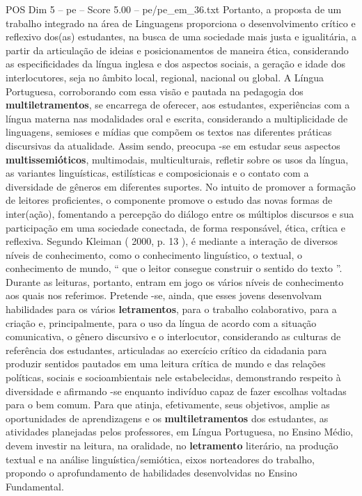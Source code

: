 \begin{textsample}{POS Dim 5 – pe – Score 5.00 – pe/pe\_em\_36.txt}
Portanto, a proposta de um trabalho integrado na área de Linguagens proporciona o desenvolvimento crítico e reflexivo dos(as) estudantes, na busca de uma sociedade mais justa e igualitária, a partir da articulação de ideias e posicionamentos de maneira ética, considerando as especificidades da língua inglesa e dos aspectos sociais, a geração e idade dos interlocutores, seja no âmbito local, regional, nacional ou global.
A Língua Portuguesa, corroborando com essa visão e pautada na pedagogia dos \textbf{multiletramentos}, se encarrega de oferecer, aos estudantes, experiências com a língua materna nas modalidades oral e escrita, considerando a multiplicidade de linguagens, semioses e mídias que compõem os textos nas diferentes práticas discursivas da atualidade.
Assim sendo, preocupa -se em estudar seus aspectos \textbf{multissemióticos}, multimodais, multiculturais, refletir sobre os usos da língua, as variantes linguísticas, estilísticas e composicionais e o contato com a diversidade de gêneros em diferentes suportes.
No intuito de promover a formação de leitores proficientes, o componente promove o estudo das novas formas de inter(ação), fomentando a percepção do diálogo entre os múltiplos discursos e sua participação em uma sociedade conectada, de forma responsável, ética, crítica e reflexiva.
Segundo Kleiman ( 2000, p. 13 ), é mediante a interação de diversos níveis de conhecimento, como o conhecimento linguístico, o textual, o conhecimento de mundo, “ que o leitor consegue construir o sentido do texto ”.
Durante as leituras, portanto, entram em jogo os vários níveis de conhecimento aos quais nos referimos.
Pretende -se, ainda, que esses jovens desenvolvam habilidades para os vários \textbf{letramentos}, para o trabalho colaborativo, para a criação e, principalmente, para o uso da língua de acordo com a situação comunicativa, o gênero discursivo e o interlocutor, considerando as culturas de referência dos estudantes, articuladas ao exercício crítico da cidadania para produzir sentidos pautados em uma leitura crítica de mundo e das relações políticas, sociais e socioambientais nele estabelecidas, demonstrando respeito à diversidade e afirmando -se enquanto indivíduo capaz de fazer escolhas voltadas para o bem comum.
Para que atinja, efetivamente, seus objetivos, amplie as oportunidades de aprendizagens e os \textbf{multiletramentos} dos estudantes, as atividades planejadas pelos professores, em Língua Portuguesa, no Ensino Médio, devem investir na leitura, na oralidade, no \textbf{letramento} literário, na produção textual e na análise linguística/semiótica, eixos norteadores do trabalho, propondo o aprofundamento de habilidades desenvolvidas no Ensino Fundamental.

\end{textsample}
